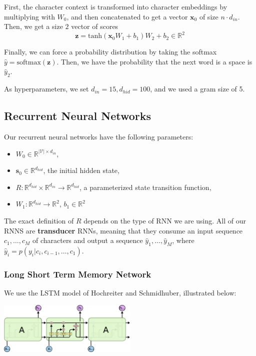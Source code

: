 \documentclass[11pt]{article}
\begin{document}
First, the character context is transformed into character embeddings by multiplying with $W_0$, and then concatenated to get a vector $\mathbf{x}_0$ of size $n \cdot d_{in}$. Then, we get a size $2$ vector of scores
$$\mathbf{z} = \text{tanh}(\mathbf{x}_0W_1 + b_1)W_2 + b_2 \in \mathbb{R}^2$$

Finally, we can force a probability distribution by taking the softmax $\hat{y} = \text{softmax}(\mathbf{z})$. Then, we have the probability that the next word is a space is $\hat{y}_2$.

As hyperparameters, we set $d_{in} = 15, d_{hid} = 100$, and we used a gram size of 5.

\subsection{Recurrent Neural Networks}

Our recurrent neural networks have the following parameters:
\begin{itemize}
  \item $W_0 \in \mathbb{R}^{|\mathcal{V}| \times d_{in}}$,
  \item $\mathbf{s}_0 \in \mathbb{R}^{d_{hid}}$, the initial hidden state,
  \item $R: \mathbb{R}^{d_{hid}} \times \mathbb{R}^{d_{in}} \to \mathbb{R}^{d_{hid}}$, a parameterized state transition function,
  \item $W_1: \mathbb{R}^{d_{hid}} \to \mathbb{R}^2$, $b_1 \in \mathbb{R}^{2}$
\end{itemize}

The exact definition of $R$ depends on the type of RNN we are using. All of our RNNS are \textbf{transducer} RNNs, meaning that they consume an input sequence $c_1, \dots, c_M$ of characters and output a sequence $\hat{y}_1, \dots, \hat{y}_M$, where $\hat{y}_i = p(y_i | c_i, c_{i-1}, \dots, c_1)$. 

\subsubsection{Long Short Term Memory Network}

We use the LSTM model of Hochreiter and Schmidhuber, illustrated below:

\begin{center}
  \includegraphics[width=0.5\textwidth]{LSTM3-chain.png}
\end{center}
\end{document}
